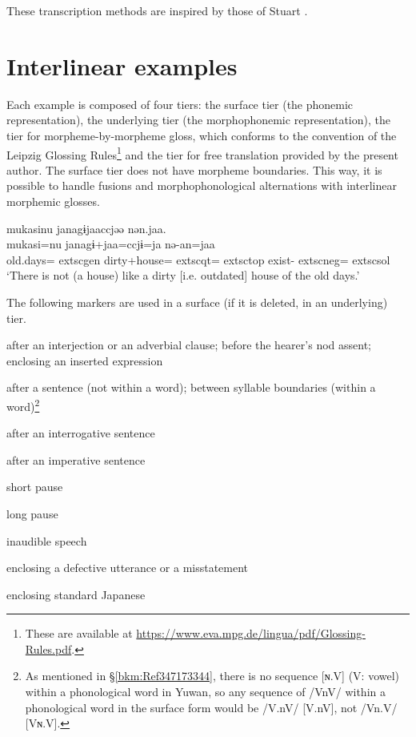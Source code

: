 
These transcription methods are inspired by those of Stuart \citet[7--9, 43--52]{McGill2009}.

\section*{Interlinear examples}

Each example is composed of four tiers: the surface tier (the phonemic representation), the underlying tier (the morphophonemic representation), the tier for morpheme-by-morpheme gloss, which conforms to the convention of the Leipzig Glossing Rules\footnote{These are available at \url{https://www.eva.mpg.de/lingua/pdf/Glossing-Rules.pdf}.} and the tier for free translation provided by the present author. The surface tier does not have morpheme boundaries. This way, it is possible to handle fusions and morphophonological alternations with interlinear morphemic glosses.

\ea
\glll mukasinu janagɨjaaccjəə nən.jaa.\\
      mukasi=nu  janagɨ+jaa=ccjɨ=ja  nə-an=jaa\\
      old.days=	extsc{gen} dirty+house=	extsc{qt}=	extsc{top} exist-	extsc{neg}=	extsc{sol}\\
\glt  ‘There is not (a house) like a dirty [i.e. outdated] house of the old days.’
\z 

The following markers are used in a surface (if it is deleted, in an underlying) tier.

\begin{description}[font=\normalfont]
\item[,]  after an interjection or an adverbial clause; before the hearer’s nod assent; enclosing an inserted expression
\item[.]  after a sentence (not within a word); between syllable boundaries (within a word)\footnote{As mentioned in §\ref{bkm:Ref347173344}, there is no sequence [ɴ.V] (V: vowel) within a phonological word in Yuwan, so any sequence of /VnV/ within a phonological word in the surface form would be /V.nV/ [V.nV], not /Vn.V/ [Vɴ.V].}
\item[?]  after an interrogative sentence
\item[!]  after an imperative sentence
\item[..]  short pause
\item[...]  long pause
\item[xxx]  inaudible speech
\item[(  )] enclosing a defective utterance or a misstatement
\item[{\textbar}  {\textbar}]  enclosing standard Japanese
\end{description} 

